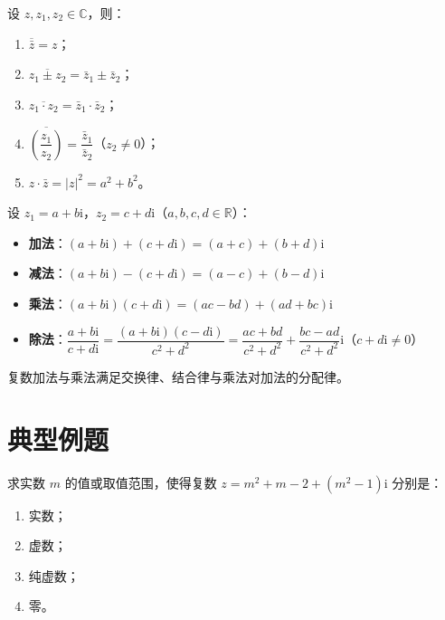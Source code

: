 \documentclass[11pt]{ctexrep}
\begin{document}
\begin{property}[共轭复数的性质]
    设 $z, z_1, z_2 \in \mathbb{C}$，则：
    \begin{enumerate}
        \item $\overline{\bar{z}} = z$；
        \item $\overline{z_1 \pm z_2} = \bar{z}_1 \pm \bar{z}_2$；
        \item $\overline{z_1 \cdot z_2} = \bar{z}_1 \cdot \bar{z}_2$；
        \item $\overline{\left(\dfrac{z_1}{z_2}\right)} = \dfrac{\bar{z}_1}{\bar{z}_2}$（$z_2 \neq 0$）；
        \item $z \cdot \bar{z} = |z|^2 = a^2 + b^2$。
    \end{enumerate}
\end{property}

\begin{property}[复数的四则运算]
    设 $z_1 = a + b\mathrm{i}$，$z_2 = c + d\mathrm{i}$（$a, b, c, d \in \mathbb{R}$）：
    \begin{itemize}
        \item \textbf{加法}：$(a + b\mathrm{i}) + (c + d\mathrm{i}) = (a + c) + (b + d)\mathrm{i}$
        \item \textbf{减法}：$(a + b\mathrm{i}) - (c + d\mathrm{i}) = (a - c) + (b - d)\mathrm{i}$
        \item \textbf{乘法}：$(a + b\mathrm{i})(c + d\mathrm{i}) = (ac - bd) + (ad + bc)\mathrm{i}$
        \item \textbf{除法}：$\dfrac{a + b\mathrm{i}}{c + d\mathrm{i}} = \dfrac{(a + b\mathrm{i})(c - d\mathrm{i})}{c^2 + d^2} = \dfrac{ac + bd}{c^2 + d^2} + \dfrac{bc - ad}{c^2 + d^2}\mathrm{i}$（$c + d\mathrm{i} \neq 0$）
    \end{itemize}
    复数加法与乘法满足交换律、结合律与乘法对加法的分配律。
\end{property}

\section*{典型例题}

\begin{example}[复数的分类讨论]
    求实数 $m$ 的值或取值范围，使得复数 $z = m^2 + m - 2 + (m^2 - 1)\mathrm{i}$ 分别是：
    \begin{enumerate}
        \item 实数；
        \item 虚数；
        \item 纯虚数；
        \item 零。
    \end{enumerate}
\end{example}
\end{document}

